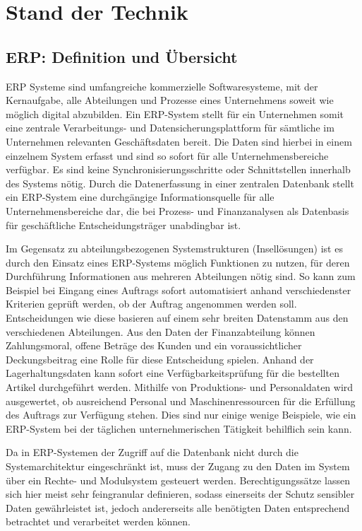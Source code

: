 \chapter{Stand der Technik}
\label{cha:Stand der Technik}

\section{ERP: Definition und Übersicht}
\label{sec:ERP: Definition und Übersicht}
	ERP Systeme sind umfangreiche kommerzielle Softwaresysteme, mit der Kernaufgabe, alle Abteilungen und Prozesse eines Unternehmens soweit wie möglich digital abzubilden\cite{doi:10.1002/smr.239}. Ein ERP-System stellt für ein Unternehmen somit eine zentrale Verarbeitungs- und Datensicherungsplattform für sämtliche im Unternehmen relevanten Geschäftsdaten bereit. Die Daten sind hierbei in einem einzelnem System erfasst und sind so sofort für alle Unternehmensbereiche verfügbar. Es sind keine Synchronisierungsschritte oder Schnittstellen innerhalb des Systems nötig. Durch die Datenerfassung in einer zentralen Datenbank stellt ein ERP-System eine durchgängige Informationsquelle für alle Unternehmensbereiche dar, die bei Prozess- und Finanzanalysen als Datenbasis für geschäftliche Entscheidungsträger unabdingbar ist.
	
	Im Gegensatz zu abteilungsbezogenen Systemstrukturen (Insellösungen) ist es durch den Einsatz eines ERP-Systems möglich Funktionen zu nutzen, für deren Durchführung Informationen aus mehreren Abteilungen nötig sind\cite{DynamicsNAV2018Anwenderbuch}. So kann zum Beispiel bei Eingang eines Auftrags sofort automatisiert anhand verschiedenster Kriterien geprüft werden, ob der Auftrag angenommen werden soll. Entscheidungen wie diese basieren auf einem sehr breiten Datenstamm aus den verschiedenen Abteilungen. Aus den Daten der Finanzabteilung können Zahlungsmoral, offene Beträge des Kunden und ein voraussichtlicher Deckungsbeitrag eine Rolle für diese Entscheidung spielen. Anhand der Lagerhaltungsdaten kann sofort eine Verfügbarkeitsprüfung für die bestellten Artikel durchgeführt werden. Mithilfe von Produktions- und Personaldaten wird ausgewertet, ob ausreichend Personal und Maschinenressourcen für die Erfüllung des Auftrags zur Verfügung stehen. Dies sind nur einige wenige Beispiele, wie ein ERP-System bei der täglichen unternehmerischen Tätigkeit behilflich sein kann.
	
	Da in ERP-Systemen der Zugriff auf die Datenbank nicht durch die Systemarchitektur eingeschränkt ist, muss der Zugang zu den Daten im System über ein Rechte- und Modulsystem gesteuert werden\cite{DynamicsNAV2018Anwenderbuch}. Berechtigungssätze lassen sich hier meist sehr feingranular definieren, sodass einerseits der Schutz sensibler Daten gewährleistet ist, jedoch andererseits alle benötigten Daten entsprechend betrachtet und verarbeitet werden können.

